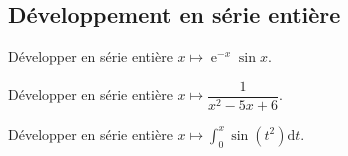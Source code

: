 \documentclass[a4paper,twoside,french,11pt]{VcCours}
\DeclareMathOperator{\e}{e}
\begin{document}
\subsection{Développement en série entière}


\begin{Exercice}{} Développer en série entière $x \mapsto \e^{-x}\sin x$.
\end{Exercice}


\begin{Exercice}{} Développer en série entière $x \mapsto \dfrac{1}{x^2-5x+6}$.
\end{Exercice}


\begin{Exercice}{} Développer en série entière $x \mapsto \int_0^x\sin(t^2)\mathrm{d}t$.
\end{Exercice}
\end{document}
